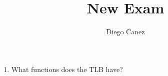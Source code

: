 \documentclass{article}
\title{New Exam}
\author{Diego Canez}
\begin{document}
\maketitle
\begin{enumerate}
\item What functions does the TLB have?
\end{enumerate}
\end{document}
